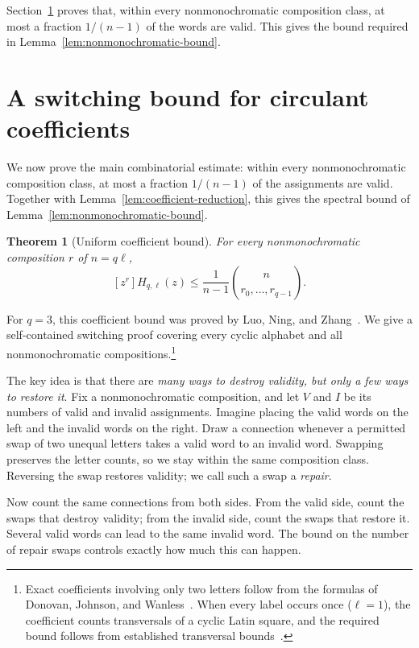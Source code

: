 \documentclass[11pt,a4paper]{article}
\numberwithin{equation}{section}
\numberwithin{figure}{section}
\numberwithin{table}{section}
\numberwithin{footnote}{section}
\newtheorem{theorem}{Theorem}[section]
\theoremstyle{informal}\newtheorem*{informaltheorem}{Informal theorem}
\theoremstyle{definition}\newtheorem{example}{Example}[section]
\theoremstyle{remark}\newtheorem{remark}[theorem]{Remark}
\newcommand{\mult}[2]{\binom{#1}{#2}}
\begin{document}
Section~\ref{sec:switching} proves that, within every nonmonochromatic
composition class, at most a fraction \(1/(n-1)\) of the words are
valid. This gives the bound required in
Lemma~\ref{lem:nonmonochromatic-bound}.

\section{A switching bound for circulant coefficients}\label{sec:switching}
We now prove the main combinatorial estimate: within every
nonmonochromatic composition class, at most a fraction \(1/(n-1)\)
of the assignments are valid. Together with
Lemma~\ref{lem:coefficient-reduction}, this gives the spectral bound
of Lemma~\ref{lem:nonmonochromatic-bound}.

\begin{theorem}[Uniform coefficient bound]\label{thm:permanent}
For every nonmonochromatic composition \(r\) of \(n=q\ell\),
\begin{equation}\label{eq:permanent}
 [z^r]H_{q,\ell}(z)\leq
 \frac{1}{n-1}\mult n{r_0,\ldots,r_{q-1}}.
\end{equation}
\end{theorem}

For \(q=3\), this coefficient bound was proved by Luo, Ning, and
Zhang~\cite[Theorem~2, Eqs.~(29)--(30)]{lnz}.
We give a self-contained switching proof covering every cyclic
alphabet and all nonmonochromatic
compositions.\footnote{Exact coefficients involving only two letters follow from the
formulas of Donovan, Johnson, and
Wanless~\cite[Theorem~5.1]{djw}. When every label occurs once
(\(\ell=1\)), the coefficient counts transversals of a cyclic Latin
square, and the required bound follows from established transversal
bounds~\cite[Theorem~8 and Eq.~(8)]{mmw}.}

The key idea is that there are \emph{many ways to destroy validity,
but only a few ways to restore it}. Fix a nonmonochromatic composition,
and let \(V\) and \(I\) be its numbers of valid and invalid
assignments. Imagine placing the valid words on the left and the
invalid words on the right. Draw a connection whenever a permitted
swap of two unequal letters takes a valid word to an invalid word.
Swapping preserves the letter counts, so we stay within the same
composition class. Reversing the swap restores validity; we call
such a swap a \emph{repair}.

Now count the same connections from both sides. From the valid side,
count the swaps that destroy validity; from the invalid side, count
the swaps that restore it. Several valid words can lead to the same
invalid word. The bound on the number of repair swaps controls
exactly how much this can happen.
\end{document}
